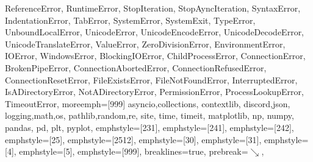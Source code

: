 {{  ReferenceError, RuntimeError, StopIteration, StopAyncIteration, SyntaxError,
  IndentationError, TabError, SystemError, SystemExit, TypeError,
  UnboundLocalError, UnicodeError, UnicodeEncodeError, UnicodeDecodeError,
  UnicodeTranslateError, ValueError, ZeroDivisionError, EnvironmentError,
  IOError, WindowsError,
  BlockingIOError, ChildProcessError, ConnectionError, BrokenPipeError,
  ConnectionAbortedError, ConnectionRefusedError, ConnectionResetError,
  FileExistsError, FileNotFoundError, InterruptedError, IsADirectoryError,
  NotADirectoryError, PermissionError, ProcessLookupError, TimeoutError},
  moreemph=[999]{%
  asyncio,collections, contextlib,
  discord,json,
  logging,math,os,
  pathlib,random,re, site,
  time, timeit,
  matplotlib, np, numpy, pandas, pd, plt, pyplot},
  emphstyle=[231]{\color{magenta}}, %
  emphstyle=[241]{\color{magenta}}, %
  emphstyle=[242]{\color{magenta}}, %
  emphstyle=[25]{\color{brightcyan}}, %
  emphstyle=[2512]{\color{brightblue}}, %
  emphstyle=[30]{\color{brightcyan}},
  emphstyle=[31]{\color{brightblue}}, %
  emphstyle=[4]{\color{brightmagenta}},
  emphstyle=[5]{\bfseries\color{red}},
  emphstyle=[999]{\color{brightyellow}}, %
  breaklines=true,
  prebreak=\mbox{{\color{brightblack}\scriptsize$\searrow$}},
}

\def\cconv#1{%
	\extractcolorspecs{#1}{\model}{\mycolor}
	\definecolor{w}{HTML}{FFFFFF} \definecolor{b}{HTML}{000000}
	\def\c@html{\convertcolorspec{\model}{\mycolor}{HTML}\tmp\tmp}
	\def\c@rgb{\convertcolorspec{\model}{\mycolor}{RGB}\tmp\tmp}
	\def\c@cmyk{\convertcolorspec{\model}{\mycolor}{cmyk}\tmp\tmp}
	\def\chonkyclr{\Large\sf\c@html}
	\vbox{\offinterlineskip\footnotesize\tt\hsize=18em
	\halign{\color{fg}
		\hfil##: &
		\vtop{\hsize=18em\parindent0em\hangindent0em \strut\color{fg}##\strut}&
		\hfil##&\hfil##&\hfil##&\hfil##\cr
		\omit\textcolor{cyan}{\MakeUppercase{\sf Colour info for #1}}\hidewidth\cr\noalign{\medskip}
		\sf HTML&\#\c@html\cr
		\sf RGB&[\c@rgb]\cr
		\sf CMYK&[\c@cmyk]\cr
	}
	\halign{
	\hfil\strut##\strut&\strut##\strut\hfil\cr
	\fcolorbox{w}{w}{\color{#1}\chonkyclr}&
	\fcolorbox{w}{b}{\color{#1}\chonkyclr}\cr
	\fcolorbox{w}{#1}{\color{w}\chonkyclr}&
	\fcolorbox{w}{#1}{\color{b}\chonkyclr}\cr\noalign{\medskip}
		}
	}
}
\makeatother


